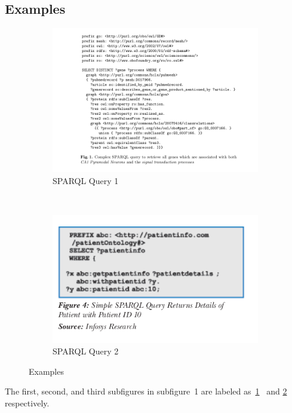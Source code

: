   \subsection{Examples}
  \begin{figure}[h!]
    \begin{subfigure}[b]{.5\linewidth}
      \includegraphics[width=1.2\textwidth]{sparql1.png}
      \caption{SPARQL Query 1}
      \label{fig:first}
    \end{subfigure}
    ~
    \begin{subfigure}[b]{.5\linewidth}
      \includegraphics[width=1.2\textwidth]{sparqlh.png}
      \caption{SPARQL Query 2}
      \label{fig:second}
    \end{subfigure}
    \caption{Examples}
    \label{fig:sparql_examples}
  \end{figure}

  \noindent The first, second, and third subfigures in subfigure\
  1 are labeled as\
  \ref{fig:first} \cite{stenzhorn2008simplifying}\
  and \ref{fig:second}  \cite{parachuri2008role} respectively.\\
